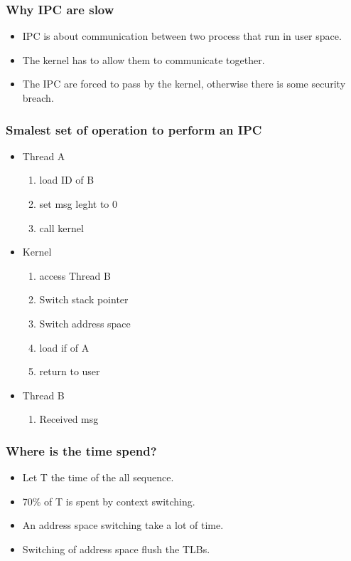 \begin{frame}
\frametitle{Why IPC are slow}
\begin{itemize}
\item IPC is about communication between two process that run in user
space.
\item The kernel has to allow them to communicate together.
\item The IPC are forced to pass by the kernel, otherwise there is some
security breach.
\end{itemize}
\end{frame}

\begin{frame}
\frametitle{Smalest set of operation to perform an IPC}
\begin{itemize}
\item Thread A
\begin{enumerate}
\item load ID of B
\item set msg leght to 0
\item call kernel
\end{enumerate}
\item Kernel
\begin{enumerate}
\item access Thread B
\item Switch stack pointer
\item Switch address space
\item load if of A
\item return to user
\end{enumerate}
\item Thread B
\begin{enumerate}
\item Received msg
\end{enumerate}
\end{itemize}
\end{frame}

\begin{frame}
\frametitle{Where is the time spend?}
\begin{itemize}
\item Let T the time of the all sequence.
\item 70\% of T is spent by context switching.
\item An address space switching take a lot of time.
\item Switching of address space flush the TLBs.
\end{itemize}
\end{frame}

